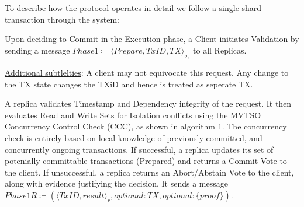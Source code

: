 To describe how the protocol operates in detail we follow a single-shard transaction through the system:


Upon deciding to Commit in the Execution phase, a Client initiates Validation by sending a message $Phase1 \coloneqq \langle Prepare, TxID, TX \rangle_{\sigma_c}$ to all Replicas.

\underline{Additional subtlelties}: A client may not equivocate this request. Any change to the TX state changes the TXiD and hence is treated as seperate TX. 

A replica validates Timestamp and Dependency integrity of the request. It then evaluates Read and Write Sets for Isolation conflicts using the MVTSO Concurrency Control Check (CCC), as shown in algorithm 1. The concurrency check is entirely based on local knowledge of previously committed, and concurrently ongoing transactions. If successful, a replica updates its set of potenially committable transactions (Prepared) and returns a Commit Vote to the client. If unsuccessful, a replica returns an Abort/Abstain Vote to the client, along with evidence justifying the decision. It sends a message $Phase1R \coloneqq (\langle TxID, result \rangle_r, optional: TX, optional: \{proof\})$.



